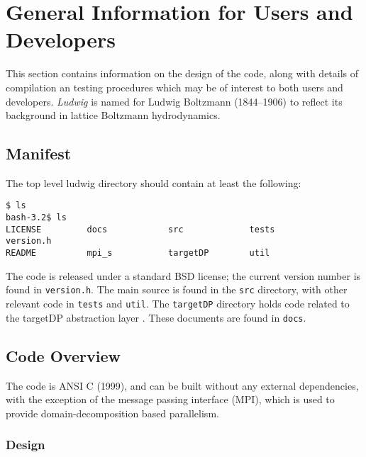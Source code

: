 %
%
%
%
%

\section{General Information for Users and Developers}

This section contains information on the design of the code, along
with details of compilation an testing procedures
which may be of interest to both users and developers.
\textit{Ludwig} is named for Ludwig Boltzmann (1844--1906) to
reflect its background in lattice Boltzmann hydrodynamics.

\subsection{Manifest}

The top level ludwig directory should contain at least the following:
\begin{lstlisting}
$ ls
bash-3.2$ ls
LICENSE         docs            src             tests           version.h
README          mpi_s           targetDP        util
\end{lstlisting}
The code is released under a standard BSD license; the current version
number is found in \texttt{version.h}. The main source is found in
the \texttt{src} directory, with other relevant code in \texttt{tests}
and \texttt{util}. The \texttt{targetDP} directory holds code related
to the targetDP abstraction layer \cite{gray2013}. These documents are
found in \texttt{docs}.

\subsection{Code Overview}

The code is ANSI C (1999), and can be built without any external
dependencies, with the exception of the message passing interface
(MPI), which is used to provide domain-decomposition based parallelism.

\subsubsection{Design}

